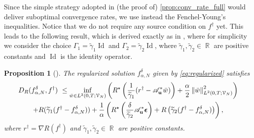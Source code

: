 \documentclass[11pt,a4paper]{article}
\numberwithin{equation}{section}
\newtheorem{proposition}[theorem]{Proposition}
\DeclareMathOperator{\R}{\mathbb{R}}
\newcommand{\norm}[1]{\left\lVert#1\right\rVert}
\renewcommand{\vec}[1]{\boldsymbol{#1}} %
\newcommand{\bu}{{\bf u}}
\newcommand{\be}{{\vec{\epsilon}}}
\newcommand{\cAbu}{\mathscr{A}_{\bu}}
\def\fdan{f^\delta_{\alpha,N}}
\def\sdiff{r}
\begin{document}
Since the simple strategy adopted in (the proof of)  \cref{prop:conv_rate_full} 
would deliver suboptimal convergence rates, we use instead the Fenchel-Young's inequalities. Notice that we do not require any source condition on $f^\dag$ yet. This leads to the following result, which is derived exactly as in \cite[proposition 3.2]{bubba2021}, where for simplicity we consider the choice $\Gamma_1 = \widetilde{\gamma}_1 \operatorname{Id}$ and $\Gamma_2 = \widetilde{\gamma}_2 \operatorname{Id}$, where $\widetilde{\gamma}_1, \widetilde{\gamma}_2 \in \R$ are positive constants and $\operatorname{Id}$ is the identity operator. 

\begin{proposition}[{\cite[Proposition 3.2]{bubba2021}}]
\label{prop:aux_convex2}
The regularized solution $\fdan$ given by \eqref{eq:regularized} satisfies
\begin{multline}
	\label{eq:aux_breg2}
	D_R(\fdan, f^\dag) \
	\leq  \inf_{\bar{w} \in L^2(0,T;\mathcal{V}_N)} \left(R^\star\left(\frac{1}{\widetilde{\gamma}_1}(\sdiff^\dag - \cAbu^* \bar w)\right) + \frac \alpha 2 \norm{\bar w}_{L^2(0,T;\mathcal{V}_N)}^2\right)  \\
	 + R(\widetilde{\gamma}_1(f^\dag - \fdan)) + \frac{1}{\alpha} \left(R^\star\left(\frac{\delta} {\widetilde{\gamma}_2} \cAbu^* \be\right)  +  R\left(\widetilde{\gamma}_2(f^\dag - \fdan)\right)\right),
\end{multline}
where $\sdiff^\dag = \nabla R(f^\dag)$ and $\widetilde{\gamma}_1, \widetilde{\gamma}_2 \in \R$ are positive constants.
\end{proposition}
\end{document}
